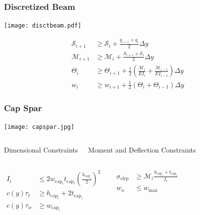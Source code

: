 \documentclass{beamer}
\begin{document}
\begin{frame}
    \frametitle{Discretized Beam}

    \pause
    \begin{center}
        \texttt{[image: disctbeam.pdf]}
    \end{center}

    \pause
    \begin{align*}
        \mathcal{S}_{i+1} &\geq \mathcal{S}_i + \frac{q_{i+1} + q_i}{2} \Delta y \\
        \mathcal{M}_{i+1} &\geq \mathcal{M}_i + \frac{\mathcal{S}_{i+1} + \mathcal{S}_i}{2} \Delta y \\
        \Theta_{i} &\geq \Theta_{i+1} + \frac{1}{2} \left(\frac{\mathcal{M}_i}{EI_i} + \frac{\mathcal{M}_{i-1}}{EI_{i-1}} \right) \Delta y \\
        w_{i} &\geq w_{i+1} + \frac{1}{2} (\Theta_i + \Theta_{i-1}) \Delta y 
    \end{align*}
\end{frame}

\begin{frame}
    \frametitle{Cap Spar}

    \pause
    \begin{center}
    \texttt{[image: capspar.jpg]}
    \end{center}

    \pause
    \begin{columns}
        \begin{center}
        Dimensional Constraints
        \end{center}
        \begin{center}
        Moment and Deflection Constraints
        \end{center}
    \end{columns}
    
    \begin{columns}
        \begin{align*}
            I_i &\leq 2w_{\text{cap}_i}t_{\text{cap}_i}\left(\frac{h_{\text{cap}_i}}{2}\right)^2 \\
            c(y)\tau_t &\geq h_{\text{cap}_i} + 2t_{\text{cap}_i} \\
            c(y)\tau_w &\geq w_{\text{cap}_i} 
        \end{align*}

        \begin{align*}
            \sigma_{\text{cfrp}} &\geq \mathcal{M}_i \frac{h_{\text{cap}_i}+t_{\text{cap}_i}}{I_i}\\
            w_n &\leq w_{\text{max}}
        \end{align*}
        
    \end{columns}

\end{frame}
\end{document}
